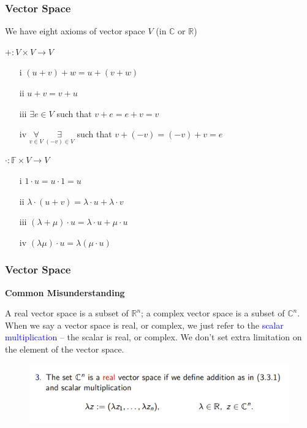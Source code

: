 \documentclass{beamer}
\begin{document}
\begin{frame}
    \frametitle{Vector Space}

    We have eight axioms of vector space $V$ (in $\mathbb{C}$ or $\mathbb{R}$)\\

    \begin{center}
        $+:V\times V\rightarrow V$
    \end{center}

    \begin{enumerate}
        \item[i]    $(u+v)+w=u+(v+w)$
        \item[ii]   $u+v=v+u$
        \item[iii]  $\exists e\in V$ such that $v+e=e+v=v$
        \item[iv]   $\underset{v\in V}{\forall}\ \underset{(-v)\in V}{\exists}$ such that $v+(-v)=(-v)+v=e$
    \end{enumerate}

    \begin{center}
        $\cdot:\mathbb{F}\times V\rightarrow V$
    \end{center}

    \begin{enumerate}
        \item[i]    $1\cdot u=u\cdot 1=u$
        \item[ii]   $\lambda\cdot(u+v)=\lambda\cdot u+\lambda\cdot v$
        \item[iii]  $(\lambda+\mu)\cdot u=\lambda\cdot u+\mu\cdot u$
        \item[iv]   $(\lambda\mu)\cdot u=\lambda(\mu\cdot u)$
    \end{enumerate}

\end{frame}
\begin{frame}
    \frametitle{Vector Space}
    \begin{center}
        \center \textbf{Common Misunderstanding}
    \end{center}
    \vspace{1em}
    A real vector space is a subset of $\mathbb{R}^n$; a complex vector space is a subset of $\mathbb{C}^n$.\\
    \vspace{1em}
    \hspace{1em}
    When we say a vector space is real, or complex, we just refer to the \textcolor{blue}{scalar multiplication} – the scalar is real, or complex. We don’t set extra limitation on the element of the vector space.
    \begin{figure}
        \centering
        \includegraphics[width=1\textwidth]{real-vec.png}
    \end{figure}
\end{frame}
\end{document}
